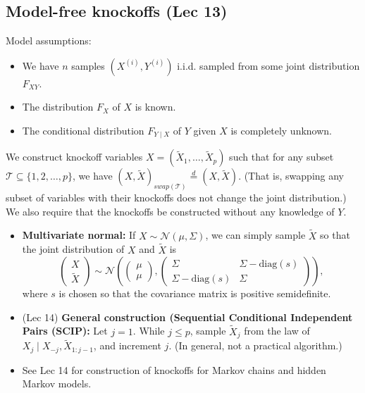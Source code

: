 \documentclass[twoside]{article}
\newcommand\calN{\mathcal{N}}
\newcommand\Sg{\Sigma}
\begin{document}
\subsection{Model-free knockoffs (Lec 13)}
Model assumptions:
\begin{itemize}
\item We have $n$ samples $(X^{(i)}, Y^{(i)})$ i.i.d. sampled from some joint distribution $F_{XY}$.
\item The distribution $F_X$ of $X$ is known.
\item The conditional distribution $F_{Y \mid X}$ of $Y$ given $X$ is completely unknown.
\end{itemize}

We construct knockoff variables $X = (\widetilde{X}_1, \dots, \widetilde{X}_p)$ such that for any subset $\mathcal{T} \subseteq \{1,2, \dots, p \}$, we have $(X, \widetilde{X})_{swap(\mathcal{T})} \stackrel{d}{=} (X, \widetilde{X})$. (That is, swapping any subset of variables with their knockoffs does not change the joint distribution.) We also require that the knockoffs be constructed without any knowledge of $Y$.

\begin{itemize}
\item \textbf{Multivariate normal:} If $X \sim \calN(\mu, \Sg)$, we can simply sample $\widetilde{X}$ so that the joint distribution of $X$ and $\widetilde{X}$ is
\[ \begin{pmatrix} X \\ \widetilde{X} \end{pmatrix} \sim \calN \left( \begin{pmatrix} \mu \\ \mu \end{pmatrix}, \begin{pmatrix} \Sg & \Sg - \text{diag}(s) \\ \Sg - \text{diag}(s) & \Sg \end{pmatrix} \right), \]
where $s$ is chosen so that the covariance matrix is positive semidefinite.

\item (Lec 14) \textbf{General construction (Sequential Conditional Independent Pairs (SCIP):} Let $j = 1$. While $j \leq p$, sample $\widetilde{X}_j$ from the law of $X_j \mid X_{-j}, \widetilde{X}_{1:j-1}$, and increment $j$. (In general, not a practical algorithm.)

\item See Lec 14 for construction of knockoffs for Markov chains and hidden Markov models.
\end{itemize}
\end{document}
